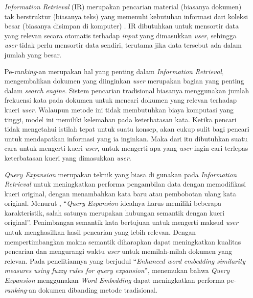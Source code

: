 \documentclass[12pt]{report}
\begin{document}
\textit{Information Retrieval} (IR) merupakan pencarian material (biasanya dokumen) tak berstruktur (biasanya teks) yang memenuhi kebutuhan informasi dari koleksi besar (biasanya disimpan di komputer) . IR dibutuhkan untuk mensortir data yang relevan secara otomatis terhadap \textit{input} yang dimasukkan \textit{user}, sehingga \textit{user} tidak perlu mensortir data sendiri, terutama jika data tersebut ada dalam jumlah yang besar.

Pe-\textit{ranking}-an merupakan hal yang penting dalam \textit{Information Retrieval}, mengembalikan dokumen yang diinginkan \textit{user} merupakan bagian yang penting dalam \textit{search engine}. Sistem pencarian tradisional biasanya menggunakan jumlah frekuensi kata pada dokumen untuk mencari dokumen yang relevan terhadap kueri \textit{user}. Walaupun metode ini tidak membutuhkan biaya komputasi yang tinggi, model ini memiliki kelemahan pada keterbatasan kata. Ketika pencari tidak mengetahui istilah tepat untuk suatu konsep, akan cukup sulit bagi pencari untuk mendapatkan informasi yang ia inginkan. Maka dari itu dibutuhkan suatu cara untuk mengerti kueri \textit{user}, untuk mengerti apa yang \textit{user} ingin cari terlepas keterbatasan kueri yang dimasukkan \textit{user}.

\textit{Query Expansion} merupakan teknik yang biasa di gunakan pada \textit{Information Retrieval} untuk meningkatkan performa pengambilan data dengan memodifikasi kueri original, dengan menambahkan kata baru atau pembobotan ulang kata original. Menurut , ``\textit{Query Expansion} idealnya harus memiliki beberapa karakteristik, salah satunya merupakan hubungan semantik dengan kueri original''. Penimbangan semantik kata bertujuan untuk mengerti maksud \textit{user} untuk menghasilkan hasil pencarian yang lebih relevan. Dengan mempertimbangkan makna semantik diharapkan dapat meningkatkan kualitas pencarian dan mengurangi waktu \textit{user} untuk memilah-milah dokumen yang relevan. Pada penelitiannya yang berjudul ``\textit{Enhanced word embedding similarity measures using fuzzy rules for query expansion}'',  menemukan bahwa \textit{Query Expansion} menggunakan \textit{Word Embedding} dapat meningkatkan performa pe-\textit{ranking}-an dokumen dibanding metode tradisional.
\end{document}
